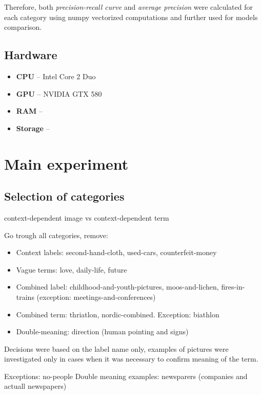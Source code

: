     Therefore, both \textit{precision-recall curve} and \textit{average precision} were calculated for each category using numpy vectorized computations and further used for models comparison.
    
    \subsection{Hardware}
    \label{sec:trial-hw}
    \begin{itemize}
        \item \textbf{CPU} -- Intel Core 2 Duo
        \item \textbf{GPU} -- NVIDIA GTX 580
        \item \textbf{RAM} -- 
        \item \textbf{Storage} -- 
    \end{itemize}


\section{Main experiment}
    \subsection{Selection of categories}
    
    context-dependent image vs context-dependent term
    
    
    Go trough all categories, remove:
    \begin{itemize}
        \item Context labels: second-hand-cloth, used-cars, counterfeit-money
        \item Vague terms: love, daily-life, future
        \item Combined label: childhood-and-youth-pictures, moos-and-lichen, fires-in-trains (exception: meetings-and-conferences)
        \item Combined term: thriatlon, nordic-combined. Exception: biathlon
        \item Double-meaning: direction (human pointing and signs)
    \end{itemize}
    Decisions were based on the label name only, examples of pictures were investigated only in cases when it was necessary to confirm meaning of the term.
    
    Exceptions: no-people
    Double meaning examples: newsparers (companies and actuall newspapers)
    
